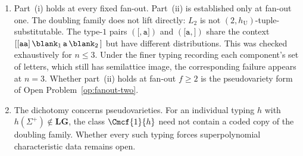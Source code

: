 \begin{remark}
\label{rem:dichotomy-scope}
\begin{enumerate}[label=\textup{(\roman*)},leftmargin=*]
\item Part~(i) holds at every fixed fan-out.  Part~(ii) is established
only at fan-out one.  The doubling family does not lift directly: $L_2$
is not $(2,h_{\mathrm U})$-tuple-substitutable.  The type-$1$ pairs
$(\mathtt[,\mathtt a\mathtt])$ and $(\mathtt[\mathtt a,\mathtt])$ share
the context $\mathtt{[[aa]}\,\blank_1\,\mathtt a\,\blank_2\,\mathtt]$
but have different distributions.  This was checked exhaustively for
$n\le3$.  Under the finer typing recording each component's set of
letters, which still has semilattice image, the corresponding failure
appears at $n=3$.  Whether part~(ii) holds
at fan-out $f\ge2$ is the pseudovariety form of
Open Problem~\ref{op:fanout-two}.
\item The dichotomy concerns pseudovarieties.  For an individual typing
$h$ with $h(\Sigma^+)\notin\mathbf{LG}$, the class $\Cmcf{1}{h}$ need
not contain a coded copy of the doubling family.  Whether every such
typing forces superpolynomial characteristic data remains open.
\end{enumerate}
\end{remark}
